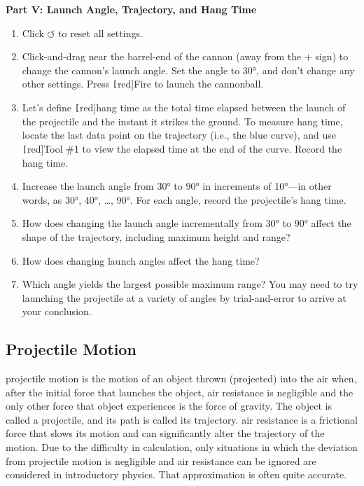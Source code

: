\documentclass[main-physics.tex]{subfiles}
\begin{document}
\vspace{1em}

\textbf{Part V: Launch Angle, Trajectory, and Hang Time}

\begin{enumerate}
    \item Click $\boldsymbol{\circlearrowleft}$ to reset all settings.
    \item Click-and-drag near the barrel-end of the cannon (away from the $\boldsymbol{+}$ sign) to change the cannon's launch angle. Set the angle to \ang{30}, and don't change any other settings. Press \texttt[red]{Fire} to launch the cannonball. 
    \item Let's define \texttt[red]{hang time} as the total time elapsed between the launch of the projectile and the instant it strikes the ground. To measure hang time, locate the last data point on the trajectory (i.e., the blue curve), and use \texttt[red]{Tool \#1} to view the elapsed time at the end of the curve. Record the hang time.
    \item Increase the launch angle from \ang{30} to \ang{90} in increments of \ang{10}---in other words, as \ang{30}, \ang{40}, \ldots, \ang{90}. For each angle, record the projectile's hang time.
    \item How does changing the launch angle incrementally from \ang{30} to \ang{90} affect the shape of the trajectory, including maximum height and range?
    \item How does changing launch angles affect the hang time?  
    \item Which angle yields the largest possible maximum range? You may need to try launching the projectile at a variety of angles by trial-and-error to arrive at your conclusion.
\end{enumerate}


\subsection{Projectile Motion} \label{tMF7JY}

\Gls{projectile motion} is the motion of an object thrown (projected) into the air when, after the initial force that launches the object, air resistance is negligible and the only other force that object experiences is the force of gravity. The object is called a \gls{projectile}, and its path is called its \gls{trajectory}. \Gls{air resistance} is a frictional force that slows its motion and can significantly alter the trajectory of the motion. Due to the difficulty in calculation, only situations in which the deviation from projectile motion is negligible and air resistance can be ignored are considered in introductory physics. That approximation is often quite accurate.
\end{document}
